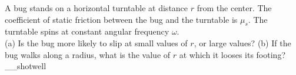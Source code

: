 A bug stands on a horizontal turntable at distance $r$ from the center.
The coefficient of static friction between the bug and the turntable
is $\mu_s$. The turntable spins at constant angular frequency $\omega$.\\
%
(a) Is the bug more likely to slip at small values of $r$, or large values?\hwendpart
%
(b) If the bug walks along a radius,
what is the value of $r$ at which it looses its footing?
__shotwell
\answercheck
